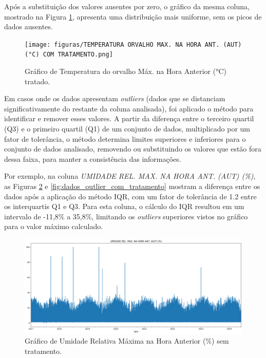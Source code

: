 Após a substituição dos valores ausentes por zero, o gráfico da mesma coluna, mostrado na Figura \ref{fig:dados_clima_poa_tratados}, apresenta uma distribuição mais uniforme, sem os picos de dados ausentes.

\begin{figure}[H]
	\caption{\label{fig:dados_clima_poa_tratados}Gráfico de Temperatura do orvalho Máx. na Hora Anterior (°C) tratado.}
	\begin{center}
		\texttt{[image: figuras/TEMPERATURA ORVALHO MAX. NA HORA ANT. (AUT) (°C) COM TRATAMENTO.png]}
	\end{center}
\end{figure}

Em casos onde os dados apresentam \textit{outliers} (dados que se distanciam significativamente do restante da coluna analisada), foi aplicado o método  para identificar e remover esses valores. A partir da diferença entre o terceiro quartil (Q3) e o primeiro quartil (Q1) de um conjunto de dados, multiplicado por um fator de tolerância, o método determina limites superiores e inferiores para o conjunto de dados analisado, removendo ou substituindo os valores que estão fora dessa faixa, para manter a consistência das informações.

Por exemplo, na coluna \textit{UMIDADE REL. MAX. NA HORA ANT. (AUT) (\%)}, as Figuras \ref{fig:dados_outlier_sem_tratamento} e \ref{fig:dados_outlier_com_tratamento} mostram a diferença entre os dados após a aplicação do método \gls{IQR}, com um fator de tolerância de 1.2 entre os interquartis Q1 e Q3. Para esta coluna, o cálculo do IQR resultou em um intervalo de -11,8\% a 35,8\%, limitando os \textit{outliers} superiores vistos no gráfico para o valor máximo calculado. 

\begin{figure}[H]
	\caption{\label{fig:dados_outlier_sem_tratamento}Gráfico de Umidade Relativa Máxima  na Hora Anterior (\%) sem tratamento.}
	\begin{center}
		\includegraphics[scale=0.3]{figuras/UMIDADE REL. MAX. NA HORA ANT. (AUT) SEM TRATAMENTO.png}
	\end{center}
\end{figure}

